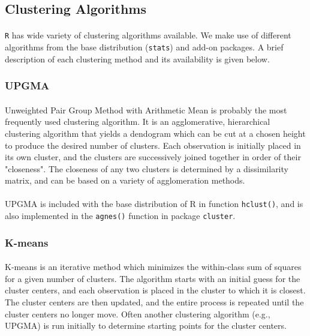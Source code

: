 \documentclass[10pt]{article}\usepackage[]{graphicx}\usepackage[]{color}
\begin{document}
\subsection{Clustering Algorithms}
\paragraph{}
\texttt{R} has wide variety of clustering algorithms available. We make use of different 
algorithms from the base distribution (\texttt{stats}) and add-on packages. 
A brief description of each clustering method and its availability is given below.

\subsubsection{UPGMA}
\paragraph{}
Unweighted Pair Group Method with Arithmetic Mean is probably the most
frequently used clustering algorithm. It is
an agglomerative, hierarchical clustering algorithm that yields a dendogram
which can be cut at a chosen height to produce the desired number of clusters.
Each observation is initially placed in its own cluster, and the clusters
are successively joined together in order of their "closeness". The closeness
of any two clusters is determined by a dissimilarity matrix, and can be
based on a variety of agglomeration methods. 
\paragraph{}
UPGMA is included with the base distribution of R in function 
\texttt{hclust()}, and is also implemented in the \texttt{agnes()}
function in package \texttt{cluster}.


\subsubsection{K-means}
\paragraph{}
K-means is an iterative method which minimizes the within-class sum of
squares for a given number of clusters. The
algorithm starts with an initial guess for the cluster centers, and each 
observation is placed in the cluster to which it is closest. The cluster centers
are then updated, and the entire process is repeated until the cluster centers
no longer move. Often another clustering algorithm (e.g., UPGMA) is
run initially to determine starting points for the cluster centers. 
\end{document}

